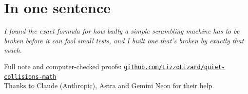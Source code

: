 \documentclass[11pt]{article}
\begin{document}
\section*{In one sentence}

\begin{center}
\emph{I found the exact formula for how badly a simple scrambling machine has
to be broken before it can fool small tests, and I built one that's broken by
exactly that much.}
\end{center}

\vspace{14pt}
{\small Full note and computer-checked proofs: \href{https://github.com/LizzoLizard/quiet-collisions-math}{\texttt{github.com/LizzoLizard/quiet-collisions-math}}\\
Thanks to Claude (Anthropic), Astra and Gemini Neon for their help.}
\end{document}
